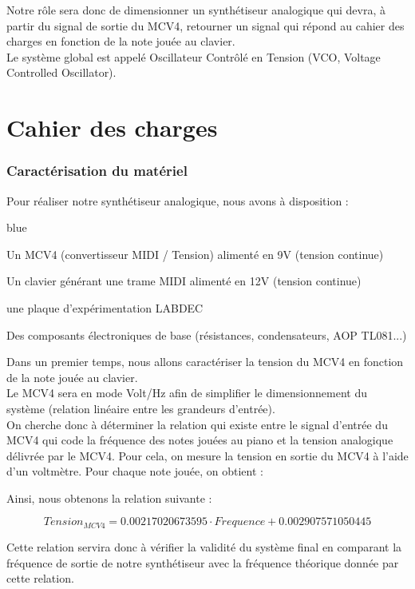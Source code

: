Notre rôle sera donc de dimensionner un synthétiseur analogique qui devra, à partir du signal de sortie du MCV4, 
retourner un signal qui répond au cahier des charges en fonction de la note jouée au clavier.\\

Le système global est appelé Oscillateur Contrôlé en Tension (VCO, Voltage Controlled Oscillator).
\chapter{Cahier des charges}

\subsection{Caractérisation du matériel}

Pour réaliser notre synthétiseur analogique, nous avons à disposition  :


\begin{items}{blue}{\Bullet}
    \item Un MCV4 (convertisseur MIDI / Tension) alimenté en 9V (tension continue)
    \item Un clavier générant une trame MIDI alimenté en 12V (tension continue)
    \item une plaque d’expérimentation LABDEC
    \item Des composants électroniques de base (résistances, condensateurs, AOP TL081...)
\end{items}

Dans un premier temps, nous allons caractériser la tension du MCV4 en fonction de la note jouée au clavier.\\
 Le MCV4 sera en mode Volt/Hz afin de simplifier le dimensionnement du système (relation linéaire entre les grandeurs d’entrée). \\

On cherche donc à déterminer la relation qui existe entre le signal d’entrée du MCV4 qui code la fréquence des notes jouées au piano et la 
tension analogique délivrée par le MCV4. Pour cela, on mesure la tension en sortie du MCV4 à l’aide d’un voltmètre. Pour chaque note jouée, on obtient :




Ainsi, nous obtenons la relation suivante : 


$$ Tension_{MCV4} =0.00217020673595 \cdot Frequence + 0.002907571050445 $$ 


Cette relation servira donc à vérifier la validité du système final en comparant la fréquence de sortie de notre 
synthétiseur avec la fréquence théorique donnée par cette relation.\\

